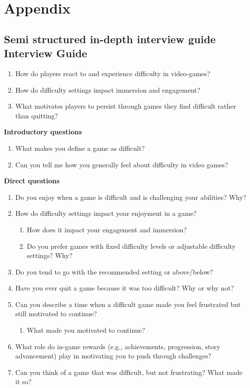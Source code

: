\section{Appendix}

\subsection{Semi structured in-depth interview guide Interview Guide}\label{Interview guide}

\begin{enumerate}
    \item How do players react to and experience difficulty in video-games? 
    \item How do difficulty settings impact immersion and engagement? 
    \item What motivates players to persist through games they find difficult rather than quitting?
\end{enumerate}

\textbf{Introductory questions}
\begin{enumerate}
    \item What makes you define a game as difficult?
    \item Can you tell me how you generally feel about difficulty in video games?
\end{enumerate}

\textbf{Direct questions}
\begin{enumerate}
    \item Do you enjoy when a game is difficult and is challenging your abilities? Why?
    \item How do difficulty settings impact your enjoyment in a game?
    \begin{enumerate}
        \item How does it impact your engagement and immersion?
        \item Do you prefer games with fixed difficulty levels or adjustable difficulty settings? Why?
    \end{enumerate}
    \item Do you tend to go with the recommended setting or above/below?
    \item Have you ever quit a game because it was too difficult? Why or why not?
    \item Can you describe a time when a difficult game made you feel frustrated but still motivated to continue?
    \begin{enumerate}
        \item What made you motivated to continue?
    \end{enumerate}
    \item What role do in-game rewards (e.g., achievements, progression, story advancement) play in motivating you to push through challenges?
    \item Can you think of a game that was difficult, but not frustrating? What made it so?
\end{enumerate}

